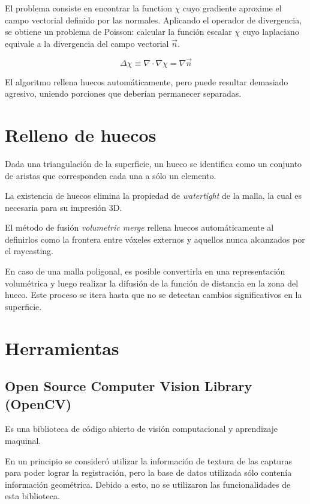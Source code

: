 \documentclass{pfc}
\begin{document}
		El problema consiste en encontrar la function $\chi$ cuyo gradiente
		aproxime el campo vectorial definido por las normales. Aplicando el
		operador de divergencia, se obtiene un problema de Poisson: calcular la
		función escalar $\chi$ cuyo laplaciano equivale a la divergencia del
		campo vectorial $\vec{n}$.\cite{Kazhdan:2006:PSR:1281957.1281965}

		\[\Delta\chi \equiv \nabla \cdot\nabla\chi = \nabla \vec{n}\]

		El algoritmo rellena huecos automáticamente, pero puede resultar demasiado agresivo, uniendo porciones que deberían permanecer separadas.


	\section{Relleno de huecos}
		Dada una triangulación de la superficie, un hueco se identifica como un conjunto de aristas que corresponden cada una a sólo un elemento.

		La existencia de huecos elimina la propiedad de \emph{watertight} de la
		malla, la cual es necesaria para su impresión 3D.

		El método de fusión \emph{volumetric merge} rellena huecos
		automáticamente al definirlos como la frontera entre vóxeles externos y
		aquellos nunca alcanzados por el raycasting.

		En caso de una malla poligonal, es posible convertirla en una
		representación volumétrica y luego realizar la difusión de la función
		de distancia en la zona del hueco.
		Este proceso se itera hasta que no se detectan cambios significativos en la superficie.\cite{fillingholes}


	\section{Herramientas}

		\subsection{Open Source Computer Vision Library (OpenCV)}
			Es una biblioteca de código abierto de
			visión computacional y aprendizaje maquinal.

			En un principio se consideró utilizar la información de textura de
			las capturas para poder lograr la registración, pero la base de
			datos utilizada sólo contenía información geométrica.
			Debido a esto, no se utilizaron las funcionalidades de esta biblioteca.
\end{document}
